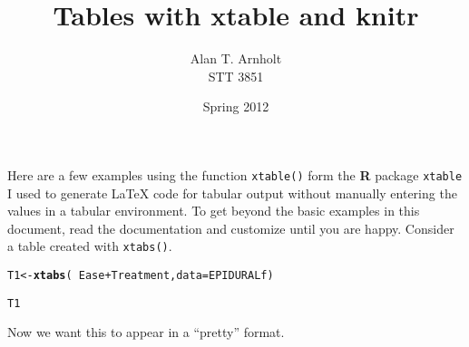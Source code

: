 \documentclass[11pt]{article}\usepackage[]{graphicx}\usepackage[]{color}
\makeatletter
\newcommand{\hlopt}[1]{\textcolor[rgb]{0,0,0}{#1}}%
\newcommand{\hlstd}[1]{\textcolor[rgb]{0.345,0.345,0.345}{#1}}%
\newcommand{\hlkwb}[1]{\textcolor[rgb]{0.69,0.353,0.396}{#1}}%
\newcommand{\hlkwc}[1]{\textcolor[rgb]{0.333,0.667,0.333}{#1}}%
\newcommand{\hlkwd}[1]{\textcolor[rgb]{0.737,0.353,0.396}{\textbf{#1}}}%
\newenvironment{kframe}{%
 \def\at@end@of@kframe{}%
 \ifinner\ifhmode%
  \def\at@end@of@kframe{\end{minipage}}%
  \begin{minipage}{\columnwidth}%
 \fi\fi%
 \def\FrameCommand##1{\hskip\@totalleftmargin \hskip-\fboxsep
 \colorbox{shadecolor}{##1}\hskip-\fboxsep
     \hskip-\linewidth \hskip-\@totalleftmargin \hskip\columnwidth}%
 \MakeFramed {\advance\hsize-\width
   \@totalleftmargin\z@ \linewidth\hsize
   \@setminipage}}%
 {\par\unskip\endMakeFramed%
 \at@end@of@kframe}
\newenvironment{knitrout}{}{} %
\makeatother
\begin{document}
\title{Tables with \textbf{xtable} and \textbf{knitr}}
\author{Alan T. Arnholt\\ STT 3851}
\date{Spring 2012}
\maketitle

\begin{knitrout}
\color{fgcolor}\begin{kframe}


{\ttfamily\noindent\color{warningcolor}{\#\# Warning in library(package, lib.loc = lib.loc, character.only = TRUE, logical.return = TRUE, : there is no package called 'PASWR'}}\end{kframe}
\end{knitrout}

Here are a few examples using the function \texttt{xtable()} form the \textbf{R} package \texttt{xtable} I used to generate \LaTeX{} code for tabular output without manually entering the values in a tabular environment. To get beyond the basic examples in this document, read the documentation and customize until you are happy.  Consider a table created with \texttt{xtabs()}.

\begin{knitrout}
\color{fgcolor}\begin{kframe}
\begin{alltt}
\hlstd{T1} \hlkwb{<-} \hlkwd{xtabs}\hlstd{(}\hlopt{~} \hlstd{Ease} \hlopt{+} \hlstd{Treatment,} \hlkwc{data} \hlstd{= EPIDURALf)}
\end{alltt}


{\ttfamily\noindent\bfseries\color{errorcolor}{\#\# Error in terms.formula(formula, data = data): object 'EPIDURALf' not found}}\begin{alltt}
\hlstd{T1}
\end{alltt}


{\ttfamily\noindent\bfseries\color{errorcolor}{\#\# Error in eval(expr, envir, enclos): object 'T1' not found}}\end{kframe}
\end{knitrout}

Now we want this to appear in a ``pretty'' format.
\end{document}

